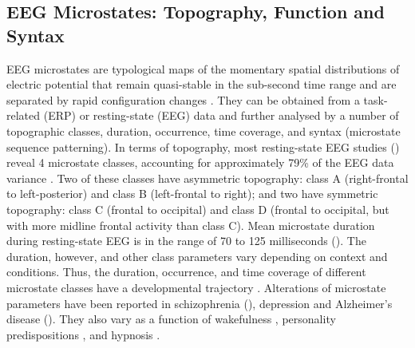 \documentclass[journal]{IEEEtran}
\begin{document}
\subsection{EEG Microstates: Topography, Function and Syntax}\label{EEG}

EEG microstates are typological maps of the momentary spatial distributions of electric potential that remain quasi-stable in the sub-second time range and are separated by rapid configuration changes \cite{Lehmann1987}. They can be obtained from a task-related (ERP) or resting-state (EEG) data and further analysed by a number of topographic classes, duration, occurrence, time coverage, and syntax (microstate sequence patterning).  
In terms of topography, most resting-state EEG studies (\cite{Koenig2002,Lehmann2005,Kindler2011})
reveal 4 microstate classes, accounting for approximately 79\%  of the EEG data variance \cite{Koenig2002}.  Two of these classes have asymmetric topography: class A (right-frontal to left-posterior) and class B (left-frontal to right); and two have symmetric topography: class C (frontal to occipital) and class D (frontal to occipital, but with more midline frontal activity than class C). 
Mean microstate duration during resting-state EEG is in the range of 70 to 125 milliseconds (\cite{Lehmann1987,Lehmann1998,Lehmann2005,Koenig2002}).
 The duration, however, and other class parameters vary depending on context and conditions.  Thus, the duration, occurrence, and time coverage of different microstate classes have a developmental trajectory \cite{Koenig2002}.  Alterations of microstate parameters have been reported in schizophrenia 
(\cite{Koenig1999,Lehmann2005,Nishida2013}), depression \cite{Strik1995} and
Alzheimer's disease (\cite{Dierks1997,Nishida2013}). They also vary as a function of wakefulness
\cite{Brodbeck2012}, personality predispositions \cite{Schmidtke2004}, and
hypnosis \cite{Katayama2007}.
\end{document}
